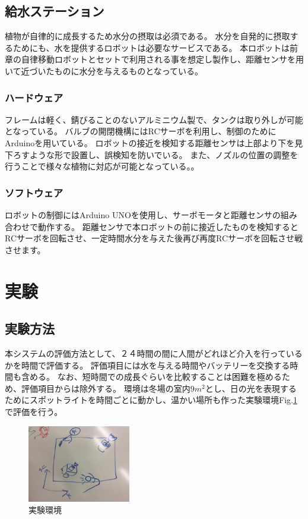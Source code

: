 \documentclass[10pt]{jsarticle}
\begin{document}
\subsection{給水ステーション}
植物が自律的に成長するため水分の摂取は必須である。
水分を自発的に摂取するためにも、水を提供するロボットは必要なサービスである。
本ロボットは前章の自律移動ロボットとセットで利用される事を想定し製作し、距離センサを用いて近づいたものに水分を与えるものとなっている。
\subsubsection{ハードウェア}
フレームは軽く、錆びることのないアルミニウム製で、タンクは取り外しが可能となっている。
バルブの開閉機構にはRCサーボを利用し、制御のためにArduinoを用いている。
ロボットの接近を検知する距離センサは上部より下を見下ろすような形で設置し、誤検知を防いでいる。
また、ノズルの位置の調整を行うことで様々な植物に対応が可能となっている。。
\subsubsection{ソフトウェア}
ロボットの制御にはArduino UNOを使用し、サーボモータと距離センサの組み合わせで動作する。
距離センサで本ロボットの前に接近したものを検知するとRCサーボを回転させ、一定時間水分を与えた後再び再度RCサーボを回転させ戦させます。

\section{実験}
\subsection{実験方法}
本システムの評価方法として、２４時間の間に人間がどれほど介入を行っているかを時間で評価する。
評価項目には水を与える時間やバッテリーを交換する時間も含める。
なお、短時間での成長ぐらいを比較することは困難を極めるため、評価項目からは除外する。
環境は冬場の室内$9m^2$とし、日の光を表現するためにスポットライトを時間ごとに動かし、温かい場所も作った実験環境Fig.\ref{experiment}で評価を行う。
\begin{figure}[ht]
    \centering
    \includegraphics[width=0.4\textwidth]{img/IMG_3896.JPG}
    \caption{実験環境}
    \label{experiment}
\end{figure}
\end{document}
